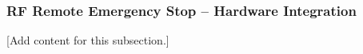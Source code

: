 
\subsubsection{RF Remote Emergency Stop -- Hardware Integration}
\label{subsubsec:design_4_2_rf_remote_estop_hardware_integration}

[Add content for this subsection.]
